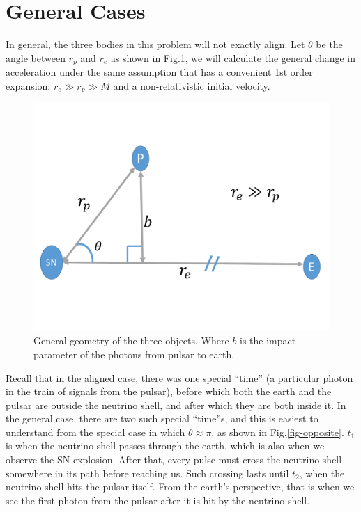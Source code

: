 \documentclass[aps,showpacs,onecolumn,floats,prd,superscriptaddress,nofootinbib]{revtex4}
\begin{document}
\section{General Cases}
\label{sec-3d}

In general, the three bodies in this problem will not exactly align. Let $\theta$ be the angle between $r_p$ and $r_e$ as shown in Fig.\ref{fig:3}, we will calculate the general change in acceleration under the same assumption that has a convenient 1st order expansion: $r_e\gg r_p\gg M$ and a non-relativistic initial velocity.

\begin{figure}[t]
\begin{center}
\includegraphics[scale = 0.3]{Image4.pdf}
\vspace{-8 mm}\caption{General geometry of the three objects. Where $b$ is the impact parameter of the photons from pulsar to earth. } 
\label{fig:3}
\end{center}
\end{figure}

Recall that in the aligned case, there was one special ``time'' (a particular photon in the train of signals from the pulsar), before which both the earth and the pulsar are outside the neutrino shell, and after which they are both inside it. In the general case, there are two such special ``time''s, and this is easiest to understand from the special case in which $\theta \approx \pi$, as shown in Fig.\ref{fig-opposite}. $t_1$ is when the neutrino shell passes through the earth, which is also when we observe the SN explosion. After that, every pulse must cross the neutrino shell somewhere in its path before reaching us. Such crossing lasts until $t_2$, when the neutrino shell hits the pulsar itself. From the earth's perspective, that is when we see the first photon from the pulsar after it is hit by the neutrino shell.
\end{document}
